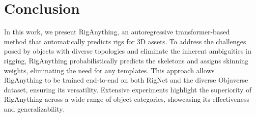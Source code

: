 \section{Conclusion}

In this work, we present RigAnything, an autoregressive transformer-based method that automatically predicts rigs for 3D assets. 
% 
To address the challenges posed by objects with diverse topologies and eliminate the inherent ambiguities in rigging, RigAnything probabilistically predicts the skeletons and assigns skinning weights, eliminating the need for any templates.
% 
This approach allows RigAnything to be trained end-to-end on both RigNet and the diverse Objaverse dataset, ensuring its versatility.
% 
Extensive experiments highlight the superiority of RigAnything across a wide range of object categories, showcasing its effectiveness and generalizability.
